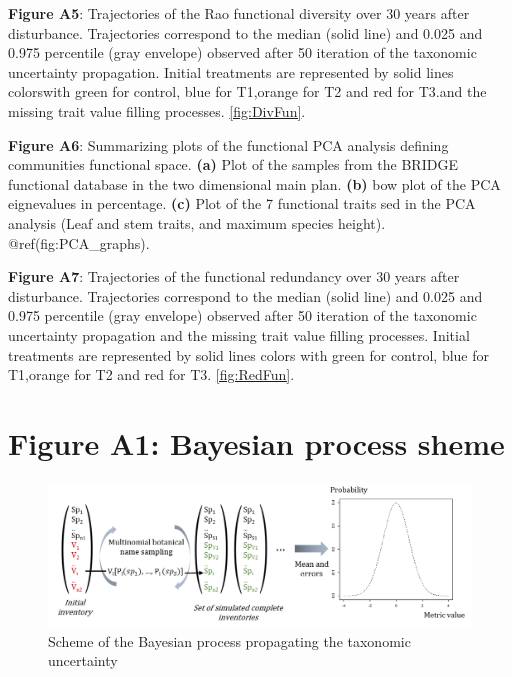 \documentclass[fleqn,10pt]{ArtEcoFoG} %
\begin{document}
\textbf{Figure A5}: Trajectories of the Rao functional diversity over 30
years after disturbance. Trajectories correspond to the median (solid
line) and 0.025 and 0.975 percentile (gray envelope) observed after 50
iteration of the taxonomic uncertainty propagation. Initial treatments
are represented by solid lines colorswith green for control, blue for
T1,orange for T2 and red for T3.and the missing trait value filling
processes. \ref{fig:DivFun}.

\textbf{Figure A6}: Summarizing plots of the functional PCA analysis
defining communities functional space. \textbf{(a)} Plot of the samples
from the BRIDGE functional database in the two dimensional main plan.
\textbf{(b)} bow plot of the PCA eignevalues in percentage. \textbf{(c)}
Plot of the 7 functional traits sed in the PCA analysis (Leaf and stem
traits, and maximum species height). @ref(fig:PCA\_graphs).

\textbf{Figure A7}: Trajectories of the functional redundancy over 30
years after disturbance. Trajectories correspond to the median (solid
line) and 0.025 and 0.975 percentile (gray envelope) observed after 50
iteration of the taxonomic uncertainty propagation and the missing trait
value filling processes. Initial treatments are represented by solid
lines colors with green for control, blue for T1,orange for T2 and red
for T3. \ref{fig:RedFun}.

\newpage

\section{\texorpdfstring{\textbf{Figure A1}: Bayesian process
sheme}{Figure A1: Bayesian process sheme}}\label{figure-a1-bayesian-process-sheme}

\begin{figure}

{\centering \includegraphics[width=1\linewidth]{ExternalFig/BayesianSheme} 

}

\caption{Scheme of the Bayesian process propagating the taxonomic uncertainty}\label{fig:FigBayesianScheme}
\end{figure}
\end{document}
